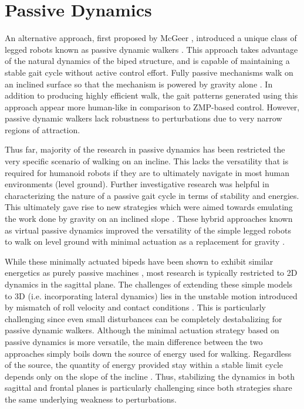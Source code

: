 \section{Passive Dynamics} %
\label{sec:passive_dynamics}
An alternative approach, first proposed by McGeer \cite{McGeer:1990uk}, introduced a unique class of legged robots known as passive dynamic walkers \cite{Collins:2005vp}. This approach takes advantage of the natural dynamics of the biped structure, and is capable of maintaining a stable gait cycle without active control effort. Fully passive mechanisms walk on an inclined surface so that the mechanism is powered by gravity alone \cite{Spong:1999vk}. In addition to producing highly efficient walk, the gait patterns generated using this approach appear more human-like in comparison to ZMP-based control. However, passive dynamic walkers lack robustness to perturbations due to very narrow regions of attraction.

Thus far, majority of the research in passive dynamics has been restricted the very specific scenario of walking on an incline. This lacks the versatility that is required for humanoid robots if they are to ultimately navigate in most human environments (level ground). Further investigative research was helpful in characterizing the nature of a passive gait cycle \cite{Goswami:1996gn} in terms of stability and energies. This ultimately gave rise to new strategies which were aimed towards emulating the work done by gravity on an inclined slope \cite{Asano:2000wi}. These hybrid approaches known as virtual passive dynamics improved the versatility of the simple legged robots to walk on level ground with minimal actuation as a replacement for gravity \cite{Asano:2004tv}. 

While these minimally actuated bipeds have been shown to exhibit similar energetics as purely passive machines \cite{Asano:2004jp}, most research is typically restricted to 2D dynamics in the sagittal plane. The challenges of extending these simple models to 3D (i.e. incorporating lateral dynamics) lies in the unstable motion introduced by mismatch of roll velocity and contact conditions \cite{Kuo:1999tn}. This is particularly challenging since even small disturbances can be completely destabalizing for passive dynamic walkers. Although the minimal actuation strategy based on passive dynamics is more versatile, the main difference between the two approaches simply boils down the source of energy used for walking. Regardless of the source, the quantity of energy provided stay within a stable limit cycle depends only on the slope of the incline \cite{Goswami:1996gn}. Thus, stabilizing the dynamics in both sagittal and frontal planes is particularly challenging since both strategies share the same underlying weakness to perturbations. 

